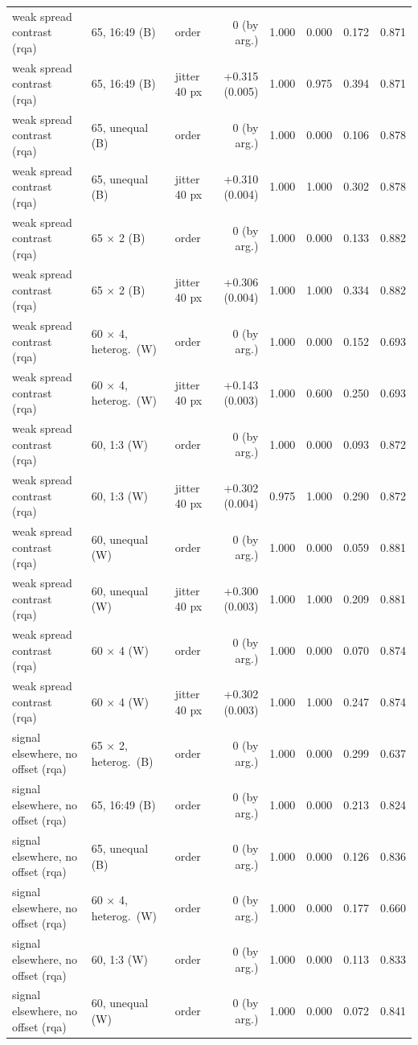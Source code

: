 \begin{longtable}{lllrrrrr}
weak spread contrast (rqa) & 65, 16:49 (B) & order & 0 (by arg.) & 1.000 & 0.000 & 0.172 & 0.871 \\
weak spread contrast (rqa) & 65, 16:49 (B) & jitter 40 px & +0.315 (0.005) & 1.000 & 0.975 & 0.394 & 0.871 \\
weak spread contrast (rqa) & 65, unequal (B) & order & 0 (by arg.) & 1.000 & 0.000 & 0.106 & 0.878 \\
weak spread contrast (rqa) & 65, unequal (B) & jitter 40 px & +0.310 (0.004) & 1.000 & 1.000 & 0.302 & 0.878 \\
weak spread contrast (rqa) & 65 $\times$ 2 (B) & order & 0 (by arg.) & 1.000 & 0.000 & 0.133 & 0.882 \\
weak spread contrast (rqa) & 65 $\times$ 2 (B) & jitter 40 px & +0.306 (0.004) & 1.000 & 1.000 & 0.334 & 0.882 \\
weak spread contrast (rqa) & 60 $\times$ 4, heterog.\ (W) & order & 0 (by arg.) & 1.000 & 0.000 & 0.152 & 0.693 \\
weak spread contrast (rqa) & 60 $\times$ 4, heterog.\ (W) & jitter 40 px & +0.143 (0.003) & 1.000 & 0.600 & 0.250 & 0.693 \\
weak spread contrast (rqa) & 60, 1:3 (W) & order & 0 (by arg.) & 1.000 & 0.000 & 0.093 & 0.872 \\
weak spread contrast (rqa) & 60, 1:3 (W) & jitter 40 px & +0.302 (0.004) & 0.975 & 1.000 & 0.290 & 0.872 \\
weak spread contrast (rqa) & 60, unequal (W) & order & 0 (by arg.) & 1.000 & 0.000 & 0.059 & 0.881 \\
weak spread contrast (rqa) & 60, unequal (W) & jitter 40 px & +0.300 (0.003) & 1.000 & 1.000 & 0.209 & 0.881 \\
weak spread contrast (rqa) & 60 $\times$ 4 (W) & order & 0 (by arg.) & 1.000 & 0.000 & 0.070 & 0.874 \\
weak spread contrast (rqa) & 60 $\times$ 4 (W) & jitter 40 px & +0.302 (0.003) & 1.000 & 1.000 & 0.247 & 0.874 \\
signal elsewhere, no offset (rqa) & 65 $\times$ 2, heterog.\ (B) & order & 0 (by arg.) & 1.000 & 0.000 & 0.299 & 0.637 \\
signal elsewhere, no offset (rqa) & 65, 16:49 (B) & order & 0 (by arg.) & 1.000 & 0.000 & 0.213 & 0.824 \\
signal elsewhere, no offset (rqa) & 65, unequal (B) & order & 0 (by arg.) & 1.000 & 0.000 & 0.126 & 0.836 \\
signal elsewhere, no offset (rqa) & 60 $\times$ 4, heterog.\ (W) & order & 0 (by arg.) & 1.000 & 0.000 & 0.177 & 0.660 \\
signal elsewhere, no offset (rqa) & 60, 1:3 (W) & order & 0 (by arg.) & 1.000 & 0.000 & 0.113 & 0.833 \\
signal elsewhere, no offset (rqa) & 60, unequal (W) & order & 0 (by arg.) & 1.000 & 0.000 & 0.072 & 0.841 \\
\end{longtable}
